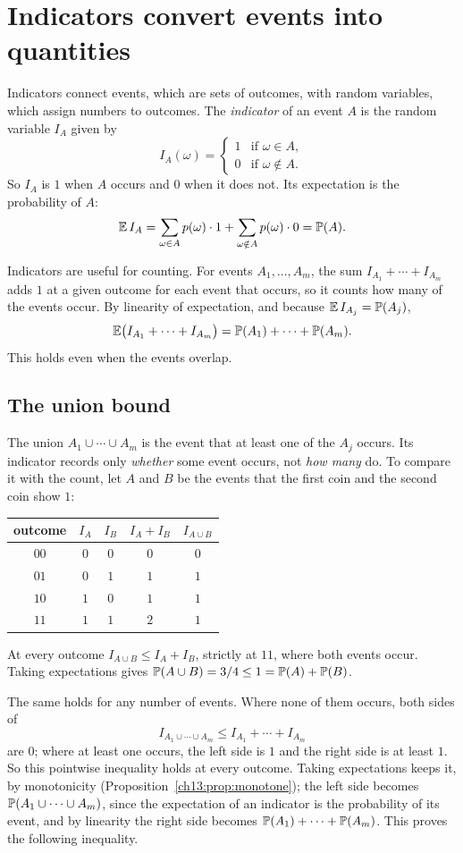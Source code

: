 \section{Indicators convert events into quantities}\label{ch13:sec:indicators}
Indicators connect events, which are sets of outcomes, with random variables, which assign numbers to outcomes. The \emph{indicator} of an event $A$ is the random variable $I_A$ given by
\[
I_A(\omega)=\begin{cases}1&\text{if }\omega\in A,\\0&\text{if }\omega\notin A.\end{cases}
\]
So $I_A$ is $1$ when $A$ occurs and $0$ when it does not. Its expectation is the probability of $A$:
\[
\operatorname{\mathbb E} I_A=\sum_{\omega\in A}p(\omega)\cdot1+\sum_{\omega\notin A}p(\omega)\cdot0=\operatorname{\mathbb P}(A).
\]

Indicators are useful for counting. For events $A_1,\ldots,A_m$, the sum $I_{A_1}+\cdots+I_{A_m}$ adds $1$ at a given outcome for each event that occurs, so it counts how many of the events occur. By linearity of expectation, and because $\operatorname{\mathbb E} I_{A_j}=\operatorname{\mathbb P}(A_j)$,
\[
\operatorname{\mathbb E}\bigl(I_{A_1}+\cdots+I_{A_m}\bigr)=\operatorname{\mathbb P}(A_1)+\cdots+\operatorname{\mathbb P}(A_m).
\]
This holds even when the events overlap.

\subsection*{The union bound}
The union $A_1\cup\cdots\cup A_m$ is the event that at least one of the $A_j$ occurs. Its indicator records only \emph{whether} some event occurs, not \emph{how many} do. To compare it with the count, let $A$ and $B$ be the events that the first coin and the second coin show $1$:
\begin{center}
\begin{tabular}{ccccc}
\toprule
outcome & $I_A$ & $I_B$ & $I_A+I_B$ & $I_{A\cup B}$\\
\midrule
$00$ & $0$ & $0$ & $0$ & $0$\\
$01$ & $0$ & $1$ & $1$ & $1$\\
$10$ & $1$ & $0$ & $1$ & $1$\\
$11$ & $1$ & $1$ & $2$ & $1$\\
\bottomrule
\end{tabular}
\end{center}
At every outcome $I_{A\cup B}\le I_A+I_B$, strictly at $11$, where both events occur. Taking expectations gives $\operatorname{\mathbb P}(A\cup B)=3/4\le1=\operatorname{\mathbb P}(A)+\operatorname{\mathbb P}(B)$.

The same holds for any number of events. Where none of them occurs, both sides of
\[
I_{A_1\cup\cdots\cup A_m}\le I_{A_1}+\cdots+I_{A_m}
\]
are $0$; where at least one occurs, the left side is $1$ and the right side is at least $1$. So this pointwise inequality holds at every outcome. Taking expectations keeps it, by monotonicity (Proposition~\ref{ch13:prop:monotone}); the left side becomes $\operatorname{\mathbb P}(A_1\cup\cdots\cup A_m)$, since the expectation of an indicator is the probability of its event, and by linearity the right side becomes $\operatorname{\mathbb P}(A_1)+\cdots+\operatorname{\mathbb P}(A_m)$. This proves the following inequality.

